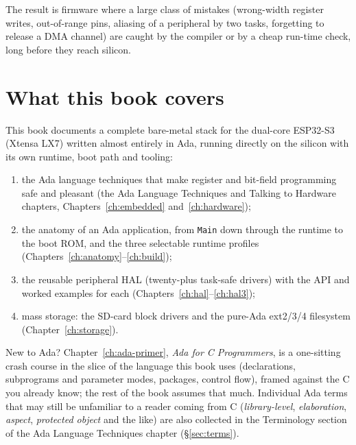 The result is firmware where a large class of mistakes (wrong-width register
writes, out-of-range pins, aliasing of a peripheral by two tasks, forgetting to
release a DMA channel) are caught by the compiler or by a cheap run-time
check, long before they reach silicon.

\section{What this book covers}

This book documents a complete bare-metal stack for the dual-core ESP32-S3
(Xtensa LX7) written almost entirely in Ada, running directly on the silicon
with its own runtime, boot path and tooling:

\begin{enumerate}
\item the Ada language techniques that make register and bit-field programming
  safe and pleasant (the Ada Language Techniques and Talking to Hardware
  chapters, Chapters~\ref{ch:embedded} and~\ref{ch:hardware});
\item the anatomy of an Ada application, from \texttt{Main} down through the
  runtime to the boot ROM, and the three selectable runtime profiles
  (Chapters~\ref{ch:anatomy}--\ref{ch:build});
\item the reusable peripheral HAL (twenty-plus task-safe drivers) with the
  API and worked examples for each (Chapters~\ref{ch:hal}--\ref{ch:hal3});
\item mass storage: the SD-card block drivers and the pure-Ada ext2/3/4
  filesystem (Chapter~\ref{ch:storage}).
\end{enumerate}

New to Ada? Chapter~\ref{ch:ada-primer}, \emph{Ada for C Programmers}, is a
one-sitting crash course in the slice of the language this book uses
(declarations, subprograms and parameter modes, packages, control flow), framed
against the C you already know; the rest of the book assumes that much. Individual
Ada terms that may still be unfamiliar to a reader coming from C
(\emph{library-level}, \emph{elaboration}, \emph{aspect}, \emph{protected object}
and the like) are also collected in the Terminology section of the Ada Language
Techniques chapter (\S\ref{sec:terms}).

